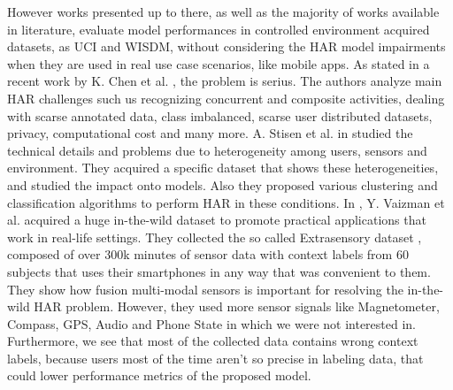 However works presented up to there, as well as the majority of works
available in literature, evaluate model performances in controlled
environment acquired datasets, as UCI and WISDM, without considering
the HAR model impairments when they are used in real use case
scenarios, like mobile apps.  As stated in a recent work by K. Chen et
al. \cite{chen2020deep}, the problem is serius. The authors analyze
main HAR challenges such us recognizing concurrent and composite
activities, dealing with scarse annotated data, class imbalanced,
scarse user distributed datasets, privacy, computational cost and many
more.  A. Stisen et al. in \cite{stisen2015smart} studied the
technical details and problems due to heterogeneity among users,
sensors and environment. They acquired a specific dataset that shows
these heterogeneities, and studied the impact onto models. Also they
proposed various clustering and classification algorithms to perform
HAR in these conditions.  In \cite{vaizman2018extrasensory},
Y. Vaizman et al.  acquired a huge in-the-wild dataset to promote
practical applications that work in real-life settings. They collected
the so called Extrasensory dataset \cite{EXTRASENSORY}, composed of
over 300k minutes of sensor data with context labels from 60 subjects
that uses their smartphones in any way that was convenient to
them. They show how fusion multi-modal sensors is important for
resolving the in-the-wild HAR problem.  However, they used more sensor
signals like Magnetometer, Compass, GPS, Audio and Phone State in
which we were not interested in. Furthermore, we see that most of the
collected data contains wrong context labels, because users most of
the time aren't so precise in labeling data, that could lower
performance metrics of the proposed model.
